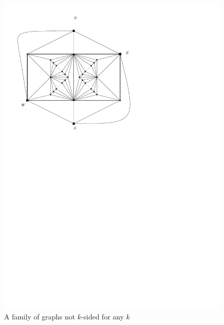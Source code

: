   \begin{figure}[b]
    \centering
    \includegraphics[scale=.5]{fixExtension/img/manymanybase}
    \caption{A family of graphs not $k$-sided for any $k$}
    \label{fig:fix:manymany0}
  \end{figure}

